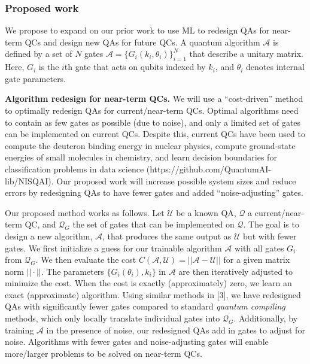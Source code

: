 \documentclass[10pt]{article}
\begin{document}



\subsubsection{Proposed work} We propose to expand on our prior work to use ML to redesign QAs for near-term QCs and design new QAs for future QCs. A quantum algorithm $\mathcal{A}$ is defined by a set of $N$ gates $\mathcal{A} = \{ G_i(k_i, \theta_i)\}_{i = 1}^{N}$ that describe a unitary matrix. Here, $G_i$ is the $i$th gate that acts on qubits indexed by $k_i$, and $\theta_i$ denotes internal gate parameters.

\textbf{Algorithm redesign for near-term QCs.} We will use a ``cost-driven'' method to optimally redesign QAs for current/near-term QCs. Optimal algorithms need to contain as few gates as possible (due to noise), and only a limited set of gates can be implemented on current QCs. Despite this, current QCs have been used to compute the deuteron binding energy in nuclear physics, compute ground-state energies of small molecules in chemistry, and learn decision boundaries for classification problems in data science (https://github.com/QuantumAI-lib/NISQAI). Our proposed work will increase possible system sizes and reduce errors by redesigning QAs to have fewer gates and added ``noise-adjusting'' gates.


Our proposed method works as follows. Let $\mathcal{U}$ be a known QA, $\mathcal{Q}$ a current/near-term QC, and $\mathcal{Q}_G$ the set of gates that can be implemented on $\mathcal{Q}$. The goal is to design a new algorithm, $\mathcal{A}$, that produces the same output as $\mathcal{U}$ but with fewer gates. We first initialize a guess for our trainable algorithm $\mathcal{A}$ with all gates $G_i$ from $\mathcal{Q}_G$. We then evaluate the cost $C(\mathcal{A}, \mathcal{U}) = || \mathcal{A} -  \mathcal{U} ||$ for a given matrix norm $|| \cdot ||$. The parameters $\{G_i(\theta_i), k_i\}$ in $\mathcal{A}$ are then iteratively adjusted to minimize the cost. When the cost is exactly (approximately) zero, we learn an exact (approximate) algorithm. Using similar methods in [3], we have redesigned QAs with significantly fewer gates compared to standard \textit{quantum compiling} methods, which only locally translate individual gates into $\mathcal{Q}_G$. Additionally, by training $\mathcal{A}$ in the presence of noise, our redesigned QAs add in gates to adjust for noise. Algorithms with fewer gates and noise-adjusting gates will enable more/larger problems to be solved on near-term QCs.
\end{document}
